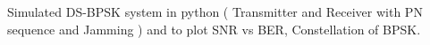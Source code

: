 \documentclass[a4paper,10pt]{article}
\begin{document}
\begin{Large}
\begin{center}
Simulated DS-BPSK system in python ( Transmitter and Receiver with PN sequence and Jamming ) and to plot SNR vs BER, Constellation of BPSK.
\end{center}
\end{Large}







  
  
  
  
  
  
  
  
  
  
  
  
  
  
  
  
  
  
  
  
  
  
\end{document}
